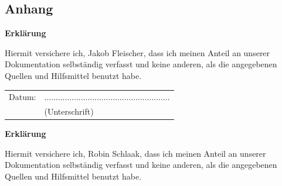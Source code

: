\documentclass[12pt,a4paper,bibliography=totocnumbered,listof=totocnumbered]{scrartcl}
\begin{document}
\begin{minipage}{\linewidth}
\pagebreak


\renewcommand\refname{Literaturverzeichnis}


\pagebreak


\setcounter{page}{1}

\begin{appendix}

\section*{Anhang}
{}


\end{appendix}


\newpage
\thispagestyle{empty}
\begin{center}
	\vspace*{5em}
	\huge\textbf{Erklärung}\\
\end{center}
\vspace{2em}
Hiermit versichere ich, Jakob Fleischer, dass ich meinen Anteil an unserer Dokumentation selbständig verfasst und keine anderen, als die angegebenen Quellen und Hilfsmittel benutzt habe.

\vspace{4em}
\begin{minipage}{\linewidth}
	\begin{tabular}{p{15em}p{15em}}
		Datum: &  .......................................................\\
		& \centering (Unterschrift)\\
	\end{tabular}
\end{minipage}



\newpage
\thispagestyle{empty}
\begin{center}
	\vspace*{5em}
	\huge\textbf{Erklärung}\\
\end{center}
\vspace{2em}
Hiermit versichere ich, Robin Schlaak, dass ich meinen Anteil an unserer Dokumentation selbständig verfasst und keine anderen, als die angegebenen Quellen und Hilfsmittel benutzt habe.


\end{minipage}
\end{document}
